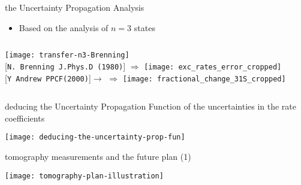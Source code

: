\begin{frame}{the Uncertainty Propagation Analysis}
	\begin{itemize}
		\item Based on the analysis of $n=3$ states
	\end{itemize}
	\vspace{-2em}
	\begin{columns}
				\texttt{[image: transfer-n3-Brenning]}\\
				\mbox{\tiny [\texttt{N. Brenning J.Phys.D (1980)}]}
				$\Rightarrow$
				\vspace{2.5cm}
				\texttt{[image: exc\_rates\_error\_cropped]}\\
				\vspace{2.1cm}
				\mbox{{\tiny [\texttt{Y Andrew PPCF(2000)}]}$\to$}
				$\Rightarrow$
				\texttt{[image: fractional\_change\_31S\_cropped]}
	\end{columns}
	
\end{frame}


\begin{frame}{deducing the Uncertainty Propagation Function of the uncertainties in the rate coefficients}
    \vspace{-0.5em}
    \begin{center}
        \texttt{[image: deducing-the-uncertainty-prop-fun]}
    \end{center}
\end{frame}

\begin{frame}{tomography measurements and the future plan (1)}
    \vspace{-0.5em}
    \begin{center}
        \texttt{[image: tomography-plan-illustration]}
    \end{center}
\end{frame}

